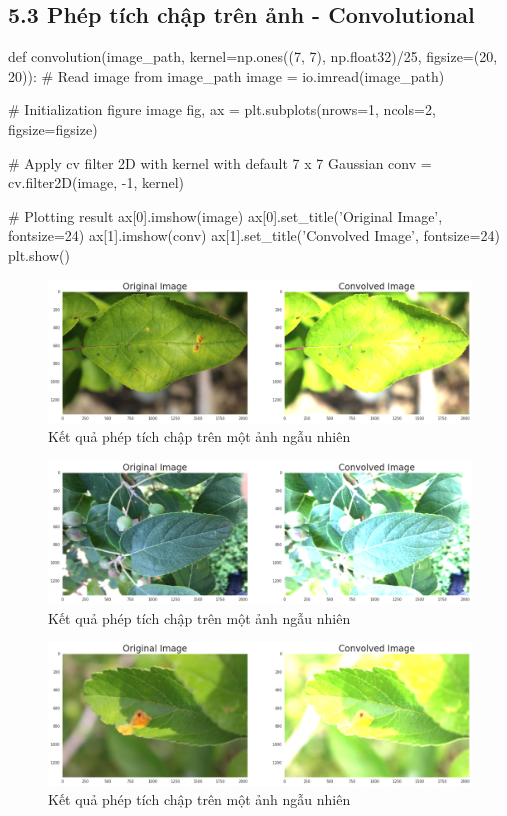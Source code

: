 \documentclass{article}
\begin{document}
	\subsection{5.3 Phép tích chập trên ảnh - Convolutional}
	\begin{python}
		def convolution(image_path, kernel=np.ones((7, 7), np.float32)/25, figsize=(20, 20)):
			# Read image from image_path
			image = io.imread(image_path)
			
			# Initialization figure image
			fig, ax = plt.subplots(nrows=1, ncols=2, figsize=figsize)
			
			# Apply cv filter 2D with kernel with default 7 x 7 Gaussian
			conv = cv.filter2D(image, -1, kernel)
			
			# Plotting result
			ax[0].imshow(image)
			ax[0].set_title('Original Image', fontsize=24)
			ax[1].imshow(conv)
			ax[1].set_title('Convolved Image', fontsize=24)
			plt.show()
	\end{python}
	\begin{figure}[H]
		\centering
		\includegraphics[width=1\linewidth]{images/conv.png}
		\caption{Kết quả phép tích chập trên một ảnh ngẫu nhiên}
		\label{fig:writing-thesis}
	\end{figure}
	\begin{figure}[H]
		\centering
		\includegraphics[width=1\linewidth]{images/conv_1.png}
		\caption{Kết quả phép tích chập trên một ảnh ngẫu nhiên}
		\label{fig:writing-thesis}
	\end{figure}
	\begin{figure}[H]
		\centering
		\includegraphics[width=1\linewidth]{images/conv_2.png}
		\caption{Kết quả phép tích chập trên một ảnh ngẫu nhiên}
		\label{fig:writing-thesis}
	\end{figure}
\end{document}
